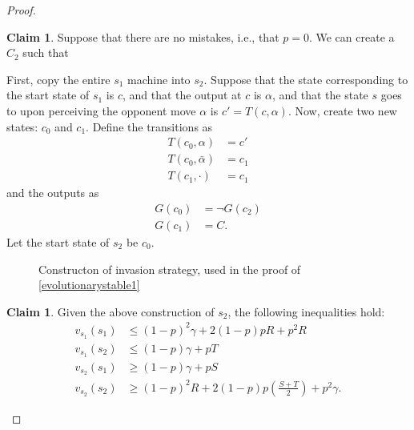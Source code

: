 \documentclass[11pt]{amsart}
\theoremstyle{definition}
\newtheorem{claim}[theorem]{Claim}
\theoremstyle{remark}
\begin{document}
    \begin{proof}
      \begin{claim}
        Suppose that there are no mistakes, i.e., that $p = 0$. We can create a $C_2$ such that 
      \end{claim}
      
      First, copy the entire $s_1$ machine into $s_2$. Suppose that the state corresponding to the start state of $s_1$ is $c$, and that the output at $c$ is $\alpha$, and that the state $s$ goes to upon perceiving the opponent move $\alpha$ is $c' = T(c, \alpha)$. Now, create two new states: $c_0$ and $c_1$. Define the transitions as \begin{align*}
        T(c_0, \alpha) &= c'\\
        T(c_0, \bar{\alpha}) &= c_1 \\
        T(c_1, \cdot) &= c_1
      \end{align*}
      and the outputs as \begin{align*}
        G(c_0) &= \lnot G(c_2)\\
        G(c_1) &= C.
      \end{align*}
      Let the start state of $s_2$ be $c_0$. 

      \begin{figure}
        \centering
        \caption{Constructon of invasion strategy, used in the proof of \cref{evolutionarystable1}}
        \label{invasionstrategy}
      \end{figure}


      \begin{claim}
        Given the above construction of $s_2$, the following inequalities hold:
      \begin{align*}
        v_{s_1}(s_1) &\leq (1-p)^2 \gamma + 2(1-p)p R + p^2  R \\ 
        v_{s_1}(s_2) &\leq (1-p) \gamma + p T \\
        v_{s_2}(s_1) &\geq (1 - p) \gamma  + p S \\
        v_{s_2}(s_2) &\geq (1-p)^{2} R + 2 (1-p) p (\tfrac{S + T}{2}) + p^2 \gamma .
      \end{align*}
      \end{claim}


\end{proof}
\end{document}
